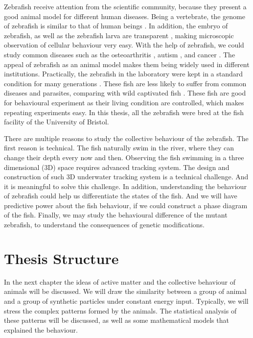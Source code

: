 \documentclass[11pt,twoside]{report}
\begin{document}
Zebrafish receive attention from the scientific community, because they present a good animal model for different human diseases. Being a vertebrate, the genome of zebrafish is similar to that of human beings \cite{howe2013}. In addition, the embryo of zebrafish, as well as the zebrafish larva are transparent \cite{kimmel1995}, making microscopic observation of cellular behaviour very easy. With the help of zebrafish, we could study common diseases such as the osteoarthritis \cite{lawrence2018, kague2021}, autism \cite{kim2017}, and cancer \cite{lopez-cuevas2021}. The appeal of zebrafish as an animal model makes them being widely used in different institutions\cite{spence2007}. Practically, the zebrafish in the laboratory were kept in a standard condition for many generations \cite{westerfield2000}. These fish are less likely to suffer from common diseases and parasites, comparing with wild captivated fish \cite{spence2007}. These fish are good for behavioural experiment as their living condition are controlled, which makes repeating experiments easy. In this thesis, all the zebrafish were bred at the fish facility of the University of Bristol.

There are multiple reasons to study the collective behaviour of the zebrafish. The first reason is technical. The fish naturally swim in the river, where they can change their depth every now and then. Observing the fish swimming in a three dimensional (3D) space requires advanced tracking system. The design and construction of such 3D underwater tracking system is a technical challenge. And it is meaningful to solve this challenge. In addition, understanding the behaviour of zebrafish could help us differentiate the states of the fish. And we will have predictive power about the fish behaviour, if we could construct a phase diagram of the fish. Finally, we may study the behavioural difference of the mutant zebrafish, to understand the consequences of genetic modifications.


\section{Thesis Structure}


In the next chapter the ideas of active matter and the collective behaviour of animals will be discussed.
We will draw the similarity between a group of animal and a group of synthetic particles under constant energy input. 
Typically, we will stress the complex patterns formed by the animals. The statistical analysis of these patterns will be discussed, as well as some mathematical models that explained the behaviour.
\end{document}
